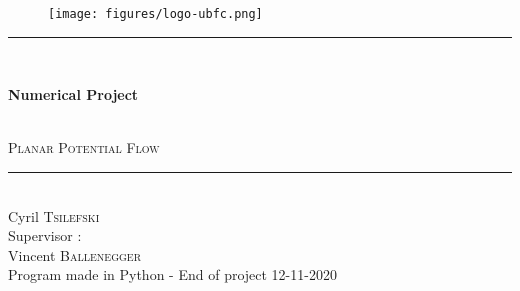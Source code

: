 \thispagestyle{empty}
\setcounter{page}{0}
\begin{center}
    \begin{figure}[!hb]
        \centering
        \texttt{[image: figures/logo-ubfc.png]}
    \end{figure}
    \vspace{7\baselineskip}
    \rule{0.75\textwidth}{1pt}\\
    \vspace{\baselineskip}
    \begin{Huge}\textbf{Numerical Project}\end{Huge}\\
    \vspace{0.5\baselineskip}
    \Large \textsc{Planar Potential Flow} \normalsize \\
    \rule{0.75\textwidth}{1pt}\\
    \vspace{\baselineskip}
    \Large Cyril \textsc{Tsilefski}\\
    \vspace{\baselineskip}
    Supervisor :\\
    {\LARGE Vincent \textsc{Ballenegger}}\\
    \vspace{\baselineskip}
    Program made in Python - End of project 12-11-2020
    \vfill
\end{center}
\setcounter{figure}{0}